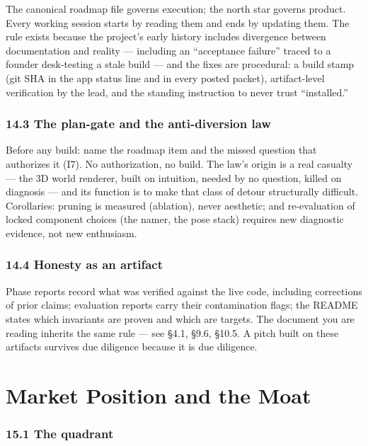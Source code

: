 The canonical roadmap file governs execution; the north star governs product. Every working session starts by reading them and ends by updating them. The rule exists because the project's early history includes divergence between documentation and reality --- including an ``acceptance failure'' traced to a founder desk-testing a stale build --- and the fixes are procedural: a build stamp (git SHA in the app status line and in every posted packet), artifact-level verification by the lead, and the standing instruction to never trust ``installed.''

\subsection{14.3 The plan-gate and the anti-diversion law}\label{the-plan-gate-and-the-anti-diversion-law}

Before any build: name the roadmap item and the missed question that authorizes it (I7). No authorization, no build. The law's origin is a real casualty --- the 3D world renderer, built on intuition, needed by no question, killed on diagnosis --- and its function is to make that class of detour structurally difficult. Corollaries: pruning is measured (ablation), never aesthetic; and re-evaluation of locked component choices (the namer, the pose stack) requires new diagnostic evidence, not new enthusiasm.

\subsection{14.4 Honesty as an artifact}\label{honesty-as-an-artifact}

Phase reports record what was verified against the live code, including corrections of prior claims; evaluation reports carry their contamination flags; the README states which invariants are proven and which are targets. The document you are reading inherits the same rule --- see \S{}4.1, \S{}9.6, \S{}10.5. A pitch built on these artifacts survives due diligence because it is due diligence.

\chapter{Market Position and the Moat}\label{market-position-and-the-moat}

\subsection{15.1 The quadrant}\label{the-quadrant}

